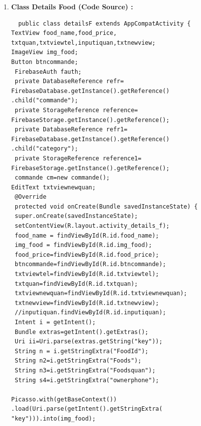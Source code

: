 \begin{enumerate}
\begin{lstlisting}
intent.putExtra("ownerphone",menuviewholder
.txtphomenu.getText().toString
());

intent.putExtra("key",category.getImageUri());
 
 startActivity(intent);
 }});};
 recycle_menu.setAdapter(adapter);}
 @Override
 public boolean onCreateOptionsMenu(Menu menu) {
 getMenuInflater().inflate(R.menu.home, menu);
 return true;}
 @Override
 public boolean onSupportNavigateUp() {
 NavController navController = Navigation.findNavController(this,
R.id.nav_host_fragment_content_home);
 return NavigationUI.navigateUp(navController,
mAppBarConfiguration)
 || super.onSupportNavigateUp();
 }
}
  \end{lstlisting}
  
  \newpage
  \item \textbf{Class Details Food  (Code Source) :}
  \begin{lstlisting}
  public class detailsF extends AppCompatActivity {
TextView food_name,food_price,
txtquan,txtviewtel,inputiquan,txtnewview;
ImageView img_food;
Button btncommande;
 FirebaseAuth fauth;
 private DatabaseReference refr=
FirebaseDatabase.getInstance().getReference()
.child("commande");
 private StorageReference reference=
FirebaseStorage.getInstance().getReference();
 private DatabaseReference refr1=
FirebaseDatabase.getInstance().getReference()
.child("category");
 private StorageReference reference1=
FirebaseStorage.getInstance().getReference();
 commande cm=new commande();
EditText txtviewnewquan;
 @Override
 protected void onCreate(Bundle savedInstanceState) {
 super.onCreate(savedInstanceState);
 setContentView(R.layout.activity_details_f);
 food_name = findViewById(R.id.food_name);
 img_food = findViewById(R.id.img_food);
 food_price=findViewById(R.id.food_price);
 btncommande=findViewById(R.id.btncommande);
 txtviewtel=findViewById(R.id.txtviewtel);
 txtquan=findViewById(R.id.txtquan);
 txtviewnewquan=findViewById(R.id.txtviewnewquan);
 txtnewview=findViewById(R.id.txtnewview);
 //inputiquan.findViewById(R.id.inputiquan);
 Intent i = getIntent();
 Bundle extras=getIntent().getExtras();
 Uri ii=Uri.parse(extras.getString("key"));
 String n = i.getStringExtra("FoodId");
 String n2=i.getStringExtra("Foods");
 String n3=i.getStringExtra("Foodsquan");
 String s4=i.getStringExtra("ownerphone");

Picasso.with(getBaseContext())
.load(Uri.parse(getIntent().getStringExtra(
"key"))).into(img_food);


\end{lstlisting}
\end{enumerate}
